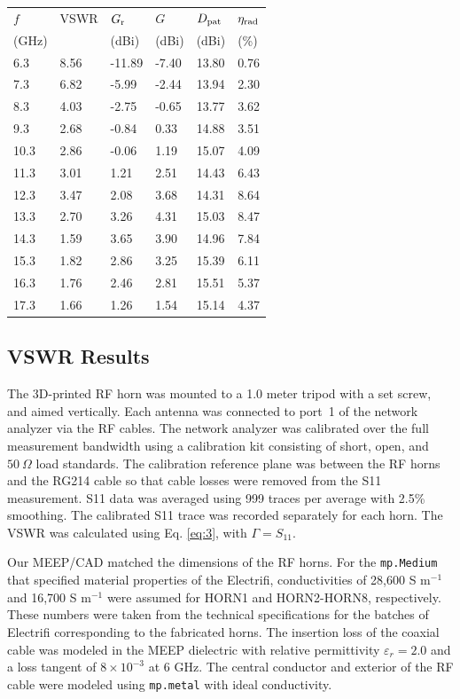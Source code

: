 \documentclass[electronics,article,submit,pdftex,moreauthors]{Definitions/mdpi}
\begin{document}
\begin{table}[t]
\begin{minipage}[t]{0.485\textwidth}
\setlength{\tabcolsep}{7pt}
\begin{tabular}{@{}llllll@{}}
\toprule
$f$ &
VSWR &
$G_{\rm r}$ &
$G$ &
$D_{\rm pat}$ &
$\eta_{\rm rad}$ \\
(GHz) & & (dBi) & (dBi) & (dBi) & (\%) \\
\midrule
 6.3 & 8.56 & -11.89 & -7.40 & 13.80 & 0.76 \\
 7.3 & 6.82 &  -5.99 & -2.44 & 13.94 & 2.30 \\
 8.3 & 4.03 &  -2.75 & -0.65 & 13.77 & 3.62 \\
 9.3 & 2.68 &  -0.84 &  0.33 & 14.88 & 3.51 \\
10.3 & 2.86 &  -0.06 &  1.19 & 15.07 & 4.09 \\
11.3 & 3.01 &   1.21 &  2.51 & 14.43 & 6.43 \\
12.3 & 3.47 &   2.08 &  3.68 & 14.31 & 8.64 \\
13.3 & 2.70 &   3.26 &  4.31 & 15.03 & 8.47 \\
14.3 & 1.59 &   3.65 &  3.90 & 14.96 & 7.84 \\
15.3 & 1.82 &   2.86 &  3.25 & 15.39 & 6.11 \\
16.3 & 1.76 &   2.46 &  2.81 & 15.51 & 5.37 \\
17.3 & 1.66 &   1.26 &  1.54 & 15.14 & 4.37 \\
\bottomrule
\end{tabular}
\end{minipage}

\end{table}

\subsection{VSWR Results}
\label{sec:vswr}

The 3D-printed RF horn was mounted to a 1.0 meter tripod with a set screw, and aimed vertically. Each antenna was connected to port~1 of the network analyzer via the RF cables. The network analyzer was calibrated over the full measurement bandwidth using a calibration kit consisting of short, open, and $50~\Omega$ load standards.  The calibration reference plane was between the RF horns and the RG214 cable so that cable losses were removed from the S11 measurement. S11 data was averaged using 999 traces per average with 2.5\% smoothing.  The calibrated S11 trace was recorded separately for each horn.  The VSWR was calculated using Eq. \ref{eq:3}, with $\Gamma=S_{11}$. 

Our MEEP/CAD matched the dimensions of the RF horns.  For the \verb+mp.Medium+ that specified material properties of the Electrifi, conductivities of 28,600 S m$^{-1}$ and 16,700 S m$^{-1}$ were assumed for HORN1 and HORN2-HORN8, respectively.  These numbers were taken from the technical specifications for the batches of Electrifi corresponding to the fabricated horns.  The insertion loss of the coaxial cable was modeled in the MEEP dielectric with relative permittivity $\varepsilon_r=2.0$ and a loss tangent of $8\times 10^{-3}$ at 6 GHz.  The central conductor and exterior of the RF cable were modeled using \texttt{mp.metal} with ideal conductivity.
\end{document}
